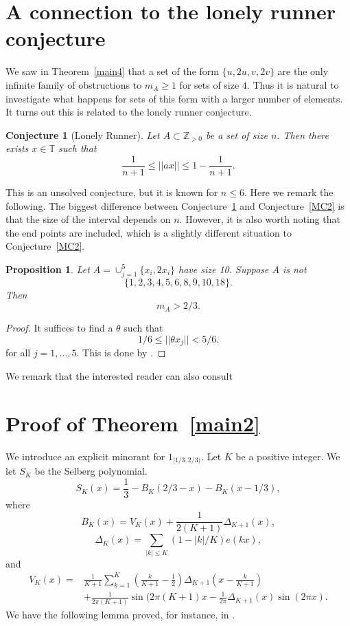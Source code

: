 \documentclass[12pt,reqno]{amsart}
\theoremstyle{dotless}
\newtheorem{prop}{Proposition}
\newtheorem{conj}{Conjecture}
\begin{document}
\section{A connection to the lonely runner conjecture}\label{LRC}

We saw in Theorem~\ref{main4} that a set of the form $\{u,2u, v , 2v\}$ are the only infinite family of obstructions to $m_A \geq 1$ for sets of size $4$. Thus it is natural to investigate what happens for sets of this form with a larger number of elements. It turns out this is related to the lonely runner conjecture. 

\begin{conj}[Lonely Runner]\label{L} Let $A\subset \mathbb{Z}_{>0}$ be a set of size $n$. Then there exists $x \in \mathbb{T}$ such that 
$$\frac{1}{n+1} \leq ||ax|| \leq 1 - \frac{1}{n+1}.$$
\end{conj}

This is an unsolved conjecture, but it is known for $n \leq 6$. Here we remark the following. The biggest difference between Conjecture~\ref{L} and Conjecture~\ref{MC2} is that the size of the interval depends on $n$. However, it is also worth noting that the end points are included, which is a slightly different situation to Conjecture~\ref{MC2}. 

\begin{prop} Let $A = \cup_{j=1}^5 \{x_i , 2x_i\}$ have size 10. Suppose $A$ is not 
$$\{1,2,3,4,5,6,8,9,10,18\}.$$ Then 
$$m_A > 2/3.$$
\end{prop}
\begin{proof}
It suffices to find a $\theta$ such that 
$$1/6 \leq ||\theta x_j|| <5/6.$$
for all $j = 1, \ldots , 5$. This is done by \cite[Thoerem 3]{BHK}.
\end{proof}

We remark that the interested reader can also consult \cite{R}

\section{Proof of Theorem~\ref{main2}}\label{finite}

We introduce an explicit minorant for $1_{[1/3,2/3)}$. Let $K$ be a positive integer. We let $S_K$ be the Selberg polynomial.
\begin{equation}\label{SK} S_K(x) = \frac{1}{3} - B_K(2/3-x) - B_K(x-1/3),\end{equation}
where 
$$B_K(x) = V_K (x) + \frac{1}{2(K+1)} \Delta_{K+1}(x),$$
$$\Delta_K(x) = \sum_{|k| \leq K} (1 - |k|/K) e(kx),$$
and 
\begin{align*}V_K(x) = &\frac{1}{K+1} \sum_{k=1}^K (\frac{k}{K+1} - \frac{1}{2})\Delta_{K+1}(x-\frac{k}{K+1}) \\ &+ \frac{1}{2\pi(K+1)} \sin(2\pi(K+1) x - \frac{1}{2\pi} \Delta_{K+1}(x) \sin(2\pi x).\end{align*}
We have the following lemma proved, for instance, in  \cite[Chapter 1]{Mo}.
\end{document}
